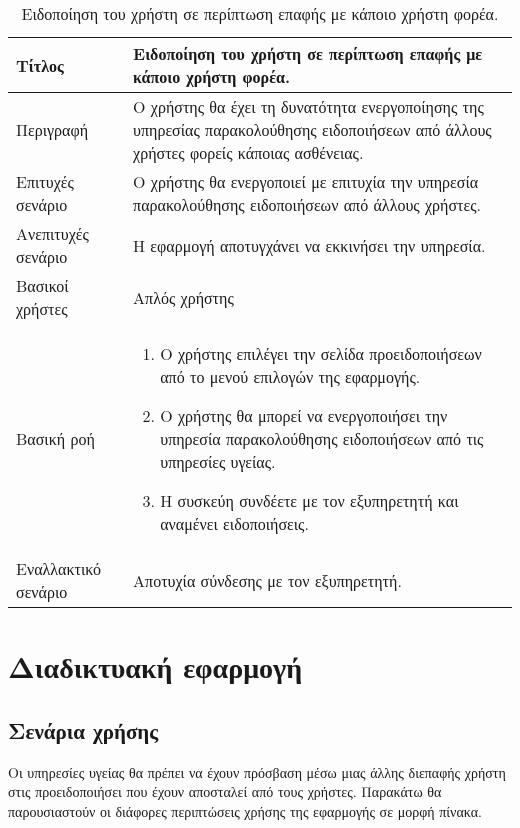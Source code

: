 \begin{table}[h]
 \caption{Ειδοποίηση του χρήστη σε περίπτωση επαφής με κάποιο χρήστη φορέα.}
\begin{center}
\begin{tabular}{ | m{10em} |  m{25em} | } 
\hline
 Τίτλος & Ειδοποίηση του χρήστη σε περίπτωση επαφής με κάποιο χρήστη φορέα. \\ 
\hline
 Περιγραφή & Ο χρήστης θα έχει τη δυνατότητα ενεργοποίησης της υπηρεσίας παρακολούθησης ειδοποιήσεων από άλλους χρήστες φορείς κάποιας ασθένειας. \\ 
\hline
 Επιτυχές σενάριο & Ο χρήστης θα ενεργοποιεί με επιτυχία την υπηρεσία παρακολούθησης ειδοποιήσεων από άλλους χρήστες.\\
\hline
 Ανεπιτυχές σενάριο  & Η εφαρμογή αποτυγχάνει να εκκινήσει την υπηρεσία. \\ 
\hline
 Βασικοί χρήστες  & Απλός χρήστης \\ 
\hline
 Βασική ροή  & 
\begin{enumerate}
\item Ο χρήστης επιλέγει την σελίδα προειδοποιήσεων από το μενού επιλογών της εφαρμογής.
\item Ο χρήστης  θα μπορεί να ενεργοποιήσει την υπηρεσία παρακολούθησης ειδοποιήσεων από τις υπηρεσίες υγείας.
\item Η συσκεύη συνδέετε με τον εξυπηρετητή και αναμένει ειδοποιήσεις.
\end{enumerate}
 \\ 
\hline
 Εναλλακτικό σενάριο  & Αποτυχία σύνδεσης με τον εξυπηρετητή.\\ 
\hline
\end{tabular}
\end{center}
\end{table}

\clearpage
\section{Διαδικτυακή εφαρμογή}

\subsection{Σενάρια χρήσης}
Οι υπηρεσίες υγείας θα πρέπει να έχουν πρόσβαση μέσω μιας άλλης διεπαφής χρήστη στις προειδοποιήσει που έχουν αποσταλεί από τους χρήστες. Παρακάτω θα παρουσιαστούν οι διάφορες περιπτώσεις χρήσης της εφαρμογής σε μορφή πίνακα.



